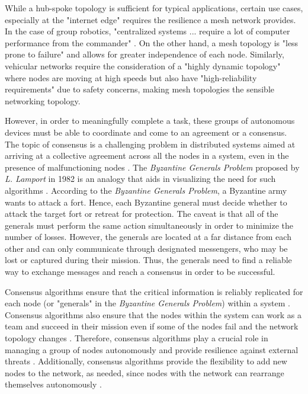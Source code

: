 While a hub-spoke topology is sufficient for typical applications, certain use cases, especially at the "internet edge" \cite{howardCoracleEvaluatingConsensus2015} requires the resilience a mesh network provides. In the case of group robotics, "centralized systems ... require a lot of computer performance from the commander" \cite{manet_drone_semenova2015network}. On the other hand, a mesh topology is "less prone to failure" \cite{manet_drone_semenova2015network} and allows for greater independence of each node. Similarly, vehicular networks require the consideration of a "highly dynamic topology" \cite{iov_wu2016internet} where nodes are moving at high speeds but also have "high-reliability requirements" \cite{iov_wu2016internet} due to safety concerns, making mesh topologies the sensible networking topology. 



However, in order to meaningfully complete a task, these groups of autonomous devices must be able to coordinate and come to an agreement or a consensus. The topic of consensus is a challenging problem in distributed systems aimed at arriving at a collective agreement across all the nodes in a system, even in the presence of malfunctioning nodes \cite{Bach_Mihaljevic_Zagar_2018}. The \textit{Byzantine Generals Problem} proposed by \textit{L. Lamport} in 1982 is an analogy that aids in visualizing the need for such algorithms \cite{Lamport_1983}. According to the \textit{Byzantine Generals Problem}, a Byzantine army wants to attack a fort. Hence, each Byzantine general must decide whether to attack the target fort or retreat for protection. The caveat is that all of the generals must perform the same action simultaneously in order to minimize the number of losses. However, the generals are located at a far distance from each other and can only communicate through designated messengers, who may be lost or captured during their mission. Thus, the generals need to find a reliable way to exchange messages and reach a consensus in order to be successful. 

Consensus algorithms ensure that the critical information is reliably replicated for each node (or "generals" in the \textit{Byzantine Generals Problem}) within a system \cite{tsitsiklis1984problems}. Consensus algorithms also ensure that the nodes within the system can work as a team and succeed in their mission even if some of the nodes fail and the network topology changes \cite{raft_paper}. Therefore, consensus algorithms play a crucial role in managing a group of nodes autonomously and provide resilience against external threats \cite{Kar_Moura_2010}. Additionally, consensus algorithms provide the flexibility to add new nodes to the network, as needed, since nodes with the network can rearrange themselves autonomously \cite{Olfati_Saber_Fax_Murray_2007}. 

